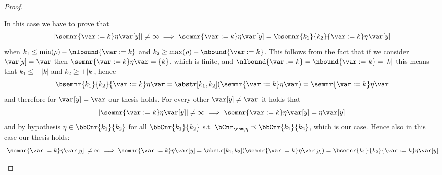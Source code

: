 \begin{proof}
\begin{inductive}
     In this case we have to prove that
    \[{|\semnr{\var := k}\eta\var[y]| \neq \infty} \implies
      {\semnr{\var := k}\eta\var[y]} = {\bsemnr{k_1}{k_2}{\var :=
          k}\eta\var[y]}\] when
    \(k_1 \leq \min(\rho) - \nlbound{\var := k}\) and
    \(k_2 \geq \max(\rho) + \nbound{\var := k}\). This follows from
    the fact that if we consider \(\var[y] = \var\) then
    \(\semnr{\var := k}\eta\var = \{k\}\), which is finite, and
    \(\nlbound{\var := k} = \nbound{\var := k} = |k|\) this means that
    \(k_1 \leq -|k|\) and \(k_2 \geq +|k|\), hence
    \begin{equation*}
      {\bsemnr{k_1}{k_2}{\var := k}\eta\var} = \abstr[k_1,k_2]({\semnr{\var := k}\eta\var}) = {\semnr{\var := k}\eta\var}
    \end{equation*}
    and therefore for \(\var[y] = \var\) our thesis holds. For every
    other \(\var[y] \neq \var\) it holds that
    \begin{equation*}
      |\semnr{\var := k}\eta\var[y]| \neq \infty
      \implies
      \semnr{\var := k}\eta\var[y] = \eta\var[y]
    \end{equation*}
    and by hypothesis \(\eta \in \bbCnr{k_1}{k_2}\) for all
    \(\bbCnr{k_1}{k_2}\) s.t.
    \(\bCnr_{\com, \eta} \preceq \bbCnr{k_1}{k_2}\), which is our
    case. Hence also in this case our thesis holds:
    \begin{equation*}
      |\semnr{\var := k}\eta\var[y]| \neq \infty
      \implies
      \semnr{\var := k}\eta\var[y] =
      \abstr[k_1,k_2]({\semnr{\var := k}\eta\var[y]}) =
      {\bsemnr{k_1}{k_2}{\var := k}\eta\var[y]}
    \end{equation*}


\end{inductive}
\end{proof}
